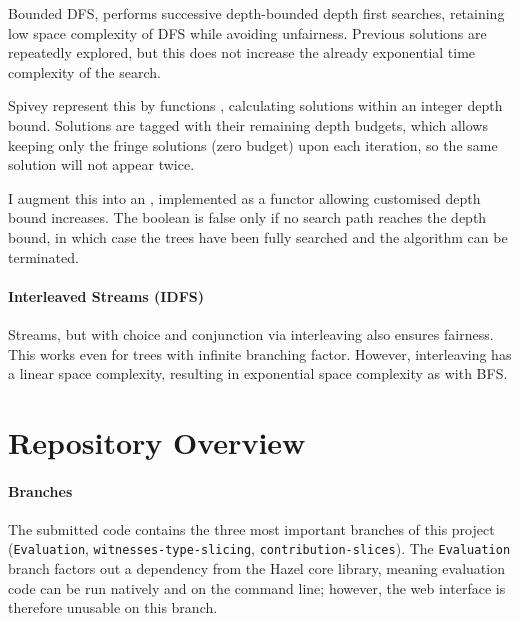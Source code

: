 Bounded DFS, performs successive depth-bounded depth first searches, retaining low space complexity of DFS while avoiding unfairness. Previous solutions are repeatedly explored, but this does not increase the already exponential time complexity of the search.

Spivey \cite{Bunches} represent this by functions , calculating solutions within an integer depth bound. Solutions are tagged with their remaining depth budgets, which allows keeping only the fringe solutions (zero budget) upon each iteration, so the same solution will not appear twice.

I augment this into an , implemented as a functor allowing customised depth bound increases. The boolean is false only if no search path reaches the depth bound, in which case the trees have been fully searched and the algorithm can be terminated.


\paragraph{Interleaved Streams (IDFS)}
Streams, but with choice and conjunction via interleaving also ensures fairness. This works even for trees with infinite branching factor. However, interleaving has a linear space complexity, resulting in exponential space complexity as with BFS.

\section{Repository Overview}
\paragraph{Branches}
The submitted code contains the three most important branches of this project (\texttt{Evaluation}, \texttt{witnesses-type-slicing}, \texttt{contribution-slices}). The \texttt{Evaluation} branch factors out a  \cite{JSOO} dependency from the Hazel core library, meaning evaluation code can be run natively and on the command line; however, the web interface is therefore unusable on this branch.

